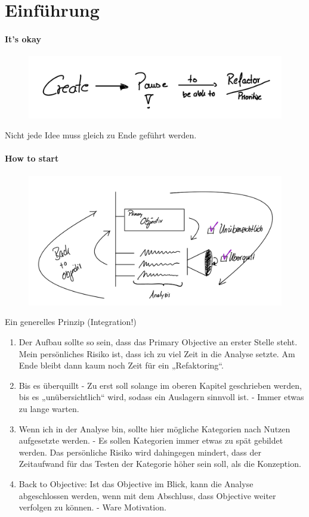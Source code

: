 \section{Einführung}
\paragraph{It's okay}

\begin{figure}[H]
	\centering
	\includegraphics[scale = 0.3]{attachment/chapter_OWN/Scc004}
\end{figure}
Nicht jede Idee muss gleich zu Ende geführt werden. 

\paragraph{How to start}

\begin{figure}[H]
	\centering
	\includegraphics[scale = 0.3]{attachment/chapter_OWN/Scc003}
\end{figure}


Ein generelles Prinzip (Integration!)
\begin{enumerate}
	\item Der Aufbau sollte so sein, dass das Primary Objective an erster Stelle steht. Mein persönliches Risiko ist, dass ich zu viel Zeit in die Analyse setzte. Am Ende bleibt dann kaum noch Zeit für ein „Refaktoring“.
	\item Bis es überquillt - Zu erst soll solange im oberen Kapitel geschrieben werden, bis es „unübersichtlich“ wird, sodass ein Auslagern sinnvoll ist. - Immer etwas zu lange warten.
	\item Wenn ich in der Analyse bin, sollte hier mögliche Kategorien nach Nutzen aufgesetzte werden. - Es sollen Kategorien immer etwas zu spät gebildet werden. Das persönliche Risiko wird dahingegen mindert, dass der Zeitaufwand für das Testen der Kategorie höher sein soll, als die Konzeption.
	\item Back to Objective: Ist das Objective im Blick, kann die Analyse abgeschlossen werden, wenn mit dem Abschluss, dass Objective weiter verfolgen zu können. - Ware Motivation. 
\end{enumerate}